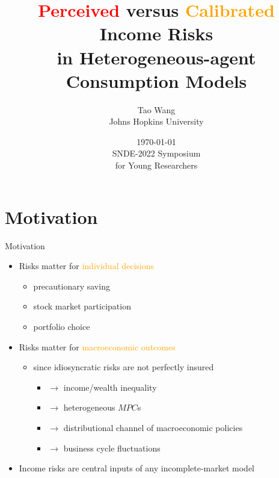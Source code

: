 \documentclass{beamer}
\title{\textcolor{red}{Perceived} versus \textcolor{orange}{Calibrated} Income Risks \\ in Heterogeneous-agent Consumption Models}
\author{Tao Wang \\ Johns Hopkins University}
\date{\today \\
	SNDE-2022 Symposium \\ for Young Researchers}
\begin{document}
	
	
\begin{frame}
	\titlepage
\end{frame}

\section{Motivation}


\begin{frame}{Motivation}
	\begin{itemize}
		\item Risks matter for \textcolor{orange}{individual decisions}
		\begin{itemize}
			\item precautionary saving 
			\item stock market participation
			\item portfolio choice 
		\end{itemize} 
		\pause 
		\item Risks matter for \textcolor{orange}{macroeconomic outcomes}
		\begin{itemize}
			\item since idiosyncratic risks are not perfectly insured 
			\begin{itemize}
				\item $\rightarrow$ income/wealth inequality 
				\item $\rightarrow$ heterogeneous $MPC$s
				\item $\rightarrow$ distributional channel of macroeconomic policies 
				\item $\rightarrow$ business cycle fluctuations
			\end{itemize}
		\end{itemize}  %
		\pause
	\item Income risks are central inputs of any incomplete-market model   

\end{itemize}
\end{frame}
\end{document}

